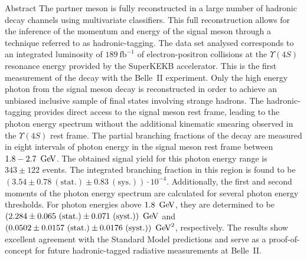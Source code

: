 \begin{abstractpage}{Abstract}
    The partner \B meson is fully reconstructed in a large number of hadronic decay channels using multivariate classifiers. 
    This full reconstruction allows for the inference of the momentum and energy of the signal \B meson through a technique referred to as hadronic-tagging.
    The data set analysed corresponds to an integrated luminosity of $189~\mathrm{fb}^{-1}$ of electron-positron collisions at the $\Upsilon(4S)$ resonance energy provided by the SuperKEKB accelerator. 
    This is the first measurement of the \BtoXsgamma decay with the Belle~II experiment.
    Only the high energy photon from the signal \B meson decay is reconstructed in order to achieve an unbiased inclusive sample of final states involving strange hadrons. 
    The hadronic-tagging provides direct access to the signal \B meson rest frame, leading to the photon energy spectrum without the additional kinematic smearing observed in the $\Upsilon(4S)$ rest frame.
    The partial branching fractions of the \BtoXsgamma decay are measured in eight intervals of photon energy in the signal \B meson rest frame between $1.8-2.7~\mathrm{\,Ge\kern -0.1em V}$. 
    The obtained signal yield for this photon energy range is $343 \pm 122$ events. 
    The integrated branching fraction in this region is found to be $(3.54 \pm 0.78~(\mathrm{stat.}) \pm 0.83~(\mathrm{sys.}))\cdot10^{-4}$.
    Additionally, the first and second moments of the photon energy spectrum are calculated for several photon energy thresholds. 
    For photon energies above $1.8~\mathrm{\,Ge\kern -0.1em V}$, they are determined to be $(2.284 \pm 0.065~(\mathrm{stat.})\pm 0.071~(\mathrm{syst.}))~\mathrm{\,Ge\kern -0.1em V}$ and $(0.0502 \pm 0.0157~(\mathrm{stat.}) \pm 0.0176~(\mathrm{syst.}))~\mathrm{\,Ge\kern -0.1em V}^2$, respectively.
    The results show excellent agreement with the Standard Model predictions and serve as a proof-of-concept for future hadronic-tagged radiative measurements at Belle~II.
        
    \end{abstractpage}
